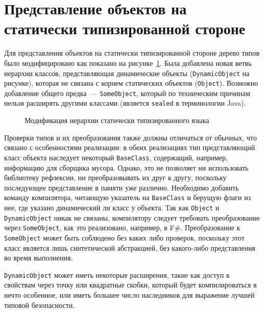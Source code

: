\documentclass[times
]{itmo-student-thesis}
\begin{document}
\section{Представление объектов на статически типизированной стороне}
Для представления объектов на статически типизированной стороне дерево типов было модифицировано как показано на рисунке~\ref{fig:statically-typed-tree}. Была добавлена новая ветвь иерархии классов, представляющая динамические объекты (\texttt{DynamicObject} на рисунке), которая не связана с корнем статических объектов (\texttt{Object}). Возможно добавление общего предка~--- \texttt{SomeObject}, который по техническим причинам нельзя расширять другими классами (является \texttt{sealed} в терминологии Java).

\begin{figure}[!h]
	\caption{Модификация иерархии статически типизированного языка}\label{fig:statically-typed-tree}
	\centering
	
\end{figure}
Проверки типов и их преобразования также должны отличаться от обычных, что связано с особенностями реализации: в обеих реализациях тип представляющий класс объекта наследует некоторый \texttt{BaseClass}, содержащий, например, информацию для сборщика мусора. Однако, это не позволяет ни использовать библиотеку рефлексии, ни преобразовывать их друг к другу, поскольку последующее представление в памяти уже различно. Необходимо добавить команду компилятора, читающую указатель на \texttt{BaseClass} и берущую флаги из нее, где указано динамический ли класс у объекта. Так как \texttt{Object} и \texttt{DynamicObject} никак не связаны, компилятору следует требовать преобразование через \texttt{SomeObject}, как это реализовано, например, в F\#. Преобразование к \texttt{SomeObject} может быть соблюдено без каких либо проверок, поскольку этот класс является лишь синтетической абстракцией, без какого-либо представления во время выполнения.

\texttt{DynamicObject} может иметь некоторые расширения, такие как доступ к свойствам через точку или квадратные скобки, который будет компилироваться в нечто особенное, или иметь большее число наследников для выражение лучшей типовой безопасности.
\end{document}

